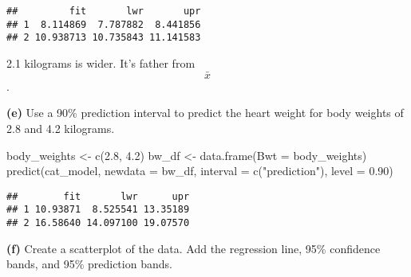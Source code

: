 \documentclass[
]{article}
\newenvironment{Shaded}{\begin{snugshade}}{\end{snugshade}}
\newcommand{\AttributeTok}[1]{\textcolor[rgb]{0.77,0.63,0.00}{#1}}
\newcommand{\FloatTok}[1]{\textcolor[rgb]{0.00,0.00,0.81}{#1}}
\newcommand{\FunctionTok}[1]{\textcolor[rgb]{0.00,0.00,0.00}{#1}}
\newcommand{\NormalTok}[1]{#1}
\newcommand{\OtherTok}[1]{\textcolor[rgb]{0.56,0.35,0.01}{#1}}
\newcommand{\StringTok}[1]{\textcolor[rgb]{0.31,0.60,0.02}{#1}}
\begin{document}
\begin{verbatim}
##         fit       lwr       upr
## 1  8.114869  7.787882  8.441856
## 2 10.938713 10.735843 11.141583
\end{verbatim}

2.1 kilograms is wider. It's father from \[\bar{x}\].

\textbf{(e)} Use a 90\% prediction interval to predict the heart weight
for body weights of 2.8 and 4.2 kilograms.

\begin{Shaded}
\begin{Highlighting}[]
\NormalTok{body\_weights }\OtherTok{\textless{}{-}} \FunctionTok{c}\NormalTok{(}\FloatTok{2.8}\NormalTok{, }\FloatTok{4.2}\NormalTok{)}
\NormalTok{bw\_df }\OtherTok{\textless{}{-}} \FunctionTok{data.frame}\NormalTok{(}\AttributeTok{Bwt =}\NormalTok{ body\_weights)}
\FunctionTok{predict}\NormalTok{(cat\_model,  }\AttributeTok{newdata =}\NormalTok{ bw\_df, }
        \AttributeTok{interval =} \FunctionTok{c}\NormalTok{(}\StringTok{"prediction"}\NormalTok{), }\AttributeTok{level =} \FloatTok{0.90}\NormalTok{)}
\end{Highlighting}
\end{Shaded}

\begin{verbatim}
##        fit       lwr      upr
## 1 10.93871  8.525541 13.35189
## 2 16.58640 14.097100 19.07570
\end{verbatim}

\textbf{(f)} Create a scatterplot of the data. Add the regression line,
95\% confidence bands, and 95\% prediction bands.
\end{document}
